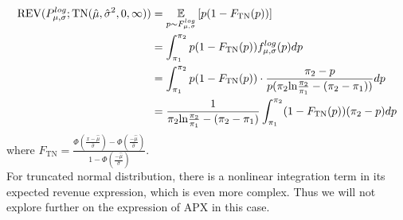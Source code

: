 \begin{equation}\notag
\begin{split}	
	\text{REV}(P^{log}_{\mu,\sigma} ;\text{TN}(\hat{\mu}, \hat{\sigma}^2, 0, \infty)) &=\underset{p \sim F^{log}_{\mu,\sigma} }{\mathbb{E}}\left[ p(1-F_{\text{TN}}(p))\right] \\ &= \int_{\pi_1}^{\pi_2} p(1 -  F_{\text{TN}}(p))f^{log}_{\mu,\sigma}(p)dp \\&=\int_{\pi_1}^{\pi_2} p(1 - F_{\text{TN}}(p) )\cdot \frac{\pi_2 -p}{p(\pi_2 \text{ln}\frac{\pi_2}{\pi_1} - (\pi_2-\pi_1))} dp \\&=  \frac{1}{\pi_2 \text{ln}\frac{\pi_2}{\pi_1} - (\pi_2-\pi_1)}\int_{\pi_1}^{\pi_2} (1 -  F_{\text{TN}}(p))(\pi_2-p)dp 
\end{split}
\end{equation} 
where $F_{\text{TN}} = \frac{\Phi(\frac{x- \hat{\mu}}{\hat{\sigma}}) - \Phi(\frac{- \hat{\mu}}{\hat{\sigma}})}{1 - \Phi(\frac{- \hat{\mu}}{\hat{\sigma}})}$.\\
For truncated normal distribution, there is a nonlinear integration term in its expected revenue expression, which is even more complex. Thus we will not explore further on the expression of APX in this case. 
